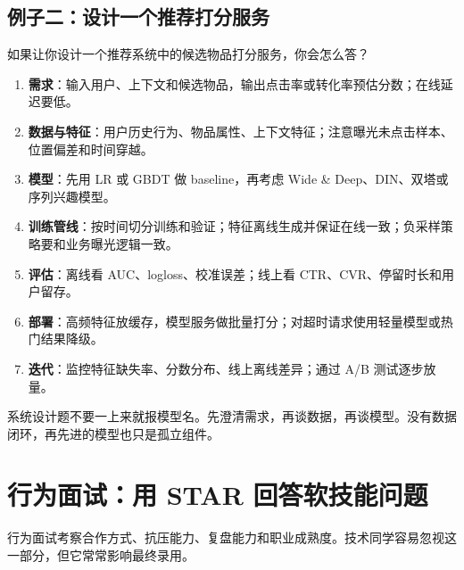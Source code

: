 \subsection{例子二：设计一个推荐打分服务}
\begin{interview}
如果让你设计一个推荐系统中的候选物品打分服务，你会怎么答？
\end{interview}
\begin{answer}
\begin{enumerate}[leftmargin=2em]
  \item \textbf{需求}：输入用户、上下文和候选物品，输出点击率或转化率预估分数；在线延迟要低。
  \item \textbf{数据与特征}：用户历史行为、物品属性、上下文特征；注意曝光未点击样本、位置偏差和时间穿越。
  \item \textbf{模型}：先用 LR 或 GBDT 做 baseline，再考虑 Wide \& Deep、DIN、双塔或序列兴趣模型。
  \item \textbf{训练管线}：按时间切分训练和验证；特征离线生成并保证在线一致；负采样策略要和业务曝光逻辑一致。
  \item \textbf{评估}：离线看 AUC、logloss、校准误差；线上看 CTR、CVR、停留时长和用户留存。
  \item \textbf{部署}：高频特征放缓存，模型服务做批量打分；对超时请求使用轻量模型或热门结果降级。
  \item \textbf{迭代}：监控特征缺失率、分数分布、线上离线差异；通过 A/B 测试逐步放量。
\end{enumerate}
\end{answer}
\begin{trap}
系统设计题不要一上来就报模型名。先澄清需求，再谈数据，再谈模型。没有数据闭环，再先进的模型也只是孤立组件。
\end{trap}
\section{行为面试：用 STAR 回答软技能问题}
行为面试考察合作方式、抗压能力、复盘能力和职业成熟度。技术同学容易忽视这一部分，但它常常影响最终录用。
